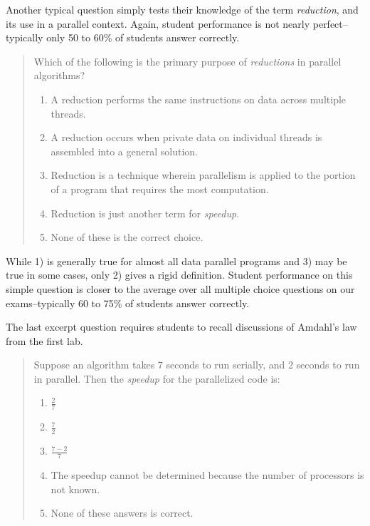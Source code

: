 \documentclass[conference]{./IEEEtran}
\begin{document}
Another typical question simply tests their knowledge of the term
\emph{reduction}, and its use in a parallel context.  Again, student performance
is not nearly perfect--typically only 50 to 60\% of students answer correctly.

\begin{quote}
Which of the following is the primary purpose of {\em reductions} in parallel
algorithms?
\begin{enumerate}
    \item A reduction performs the same instructions on data across multiple
        threads.
    \item A reduction occurs when private data on individual threads is
        assembled into a general solution.
    \item Reduction is a technique wherein parallelism is applied to the portion
        of a program that requires the most computation. 
    \item Reduction is just another term for {\em speedup}.
    \item None of these is the correct choice.
\end{enumerate}
\end{quote}

While 1) is generally true for almost all data parallel programs and 3) may be
true in some cases, only 2) gives a rigid definition.  Student performance on
this simple question is closer to the average over all multiple choice questions
on our exams--typically 60 to 75\% of students answer correctly.  

The last excerpt question requires students to recall discussions of Amdahl's
law from the first lab. 

\begin{quote}
Suppose an algorithm takes 7 seconds to run serially, and 2 seconds to run in
parallel.  Then the {\em speedup} for the parallelized code is:

\begin{enumerate}
    \setlength{\itemsep}{4pt}
    \item $\frac{2}{7}$
    \item $\frac{7}{2}$
    \item $\frac{7-2}{7}$
    \item The speedup cannot be determined because the number of processors is
        not known.
    \item None of these answers is correct.
\end{enumerate}
\end{quote}
\end{document}

